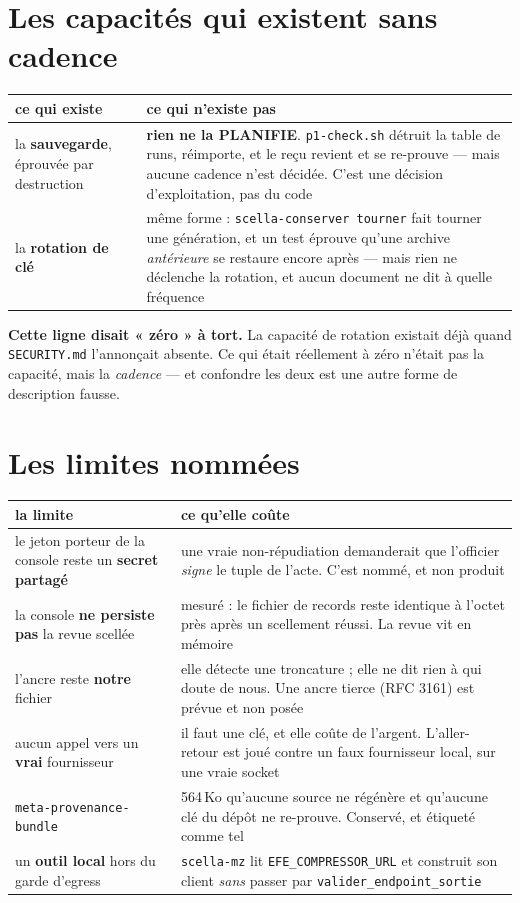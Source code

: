 \documentclass[10pt]{report}
\newcommand{\code}[1]{\texttt{\small #1}}
\newcommand{\att}[1]{\textcolor{amber}{\textbf{#1}}}
\begin{document}
\section{Les capacités qui existent sans cadence}

\begin{longtable}{@{}p{4.4cm}p{10.6cm}@{}}
\toprule \textbf{ce qui existe} & \textbf{ce qui n'existe pas} \\ \midrule \endhead
la \textbf{sauvegarde}, éprouvée par destruction & \textbf{rien ne la PLANIFIE}. \code{p1-check.sh} détruit la table de runs, réimporte, et le reçu revient et se re-prouve --- mais aucune cadence n'est décidée. C'est une décision d'exploitation, pas du code \\
la \textbf{rotation de clé} & même forme : \code{scella-conserver tourner} fait tourner une génération, et un test éprouve qu'une archive \emph{antérieure} se restaure encore après --- mais rien ne déclenche la rotation, et aucun document ne dit à quelle fréquence \\
\bottomrule
\end{longtable}

\att{Cette ligne disait « zéro » à tort.} La capacité de rotation existait déjà quand
\code{SECURITY.md} l'annonçait absente. Ce qui était réellement à zéro n'était pas la capacité, mais
la \emph{cadence} --- et confondre les deux est une autre forme de description fausse.

\section{Les limites nommées}

\begin{longtable}{@{}p{5.0cm}p{10.0cm}@{}}
\toprule \textbf{la limite} & \textbf{ce qu'elle coûte} \\ \midrule \endhead
le jeton porteur de la console reste un \textbf{secret partagé} & une vraie non-répudiation demanderait que l'officier \emph{signe} le tuple de l'acte. C'est nommé, et non produit \\
la console \textbf{ne persiste pas} la revue scellée & mesuré : le fichier de records reste identique à l'octet près après un scellement réussi. La revue vit en mémoire \\
l'ancre reste \textbf{notre} fichier & elle détecte une troncature ; elle ne dit rien à qui doute de nous. Une ancre tierce (RFC 3161) est prévue et non posée \\
aucun appel vers un \textbf{vrai} fournisseur & il faut une clé, et elle coûte de l'argent. L'aller-retour est joué contre un faux fournisseur local, sur une vraie socket \\
\code{meta-provenance-bundle} & 564\,Ko qu'aucune source ne régénère et qu'aucune clé du dépôt ne re-prouve. Conservé, et étiqueté comme tel \\
un \textbf{outil local} hors du garde d'egress & \code{scella-mz} lit \code{EFE\_COMPRESSOR\_URL} et construit son client \emph{sans} passer par \code{valider\_endpoint\_sortie} \\
\bottomrule
\end{longtable}
\end{document}
